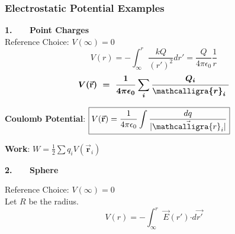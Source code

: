 \documentclass[12pt]{article}
\newcommand{\scripty}[1]{\ensuremath{\mathcalligra{#1}}}
\newcommand*{\cursr}{\scripty{r}}		%
\newcommand*{\dotP}{\boldsymbol \cdot}		%
\begin{document}
%
%
\newpage
\begin{landscape}

\subsubsection{Electrostatic Potential Examples}
\vspace{10pt}
\begin{minipage}[t]{0.5\textwidth}
	\textbf{1. \ \ \ Point Charges}\\[10pt]
	Reference Choice: \( V(\infty) = 0\)
	\[ V( r ) = - \int_{ \infty }^{r} \frac{k Q}{(r')^2} dr'
		= \frac{Q}{4 \pi \epsilon_0} \frac{1}{r} \]
	\[ \boldsymbol{ V(\vec{ \mathbf{r} }) \ 
		= \ \frac{1}{4 \pi \epsilon_0} \sum_i \frac{Q_i}{\cursr_i \ } } \]
	
	\vspace{20pt}
	\textbf{Coulomb Potential}: \indent 
	\( \displaystyle \boxed{ V(\vec{ \mathbf{r} }) 
		= \frac{1}{4 \pi \epsilon_0} \int \frac{dq}{| \vec{\cursr_i} |} }\)

	\vspace{20pt}
	\textbf{Work}: \indent 
	\( \displaystyle \boxed{ W = \frac{1}{2} \sum q_i V(\vec{ \mathbf{r} }_i) } \)
\end{minipage}

\vspace{30pt}
\begin{minipage}[t]{.61\textwidth}
	\textbf{2. \ \ \ Sphere}

	\vspace{15pt}
	Reference Choice:  \( V(\infty) = 0\)\\[15pt]
	Let \(R\) be the radius.
	\[ V(r) = - \int_{\infty}^r \vec{E}(r') \dotP d\vec{r'} \]


\end{minipage}
\end{landscape}
\end{document}
